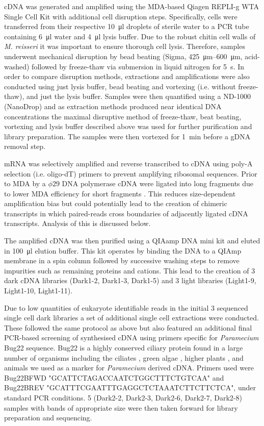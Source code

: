 cDNA was generated and amplified using the MDA-based Qiagen REPLI-g WTA Single Cell Kit \citep{Korfhage2015}
with additional cell disruption steps. 
Specifically, cells were transferred from their respective \SI{10}{\micro\litre} droplets of sterile water to
a PCR tube containing \SI{6}{\micro\litre} water and \SI{4}{\micro\litre} lysis buffer. 
Due to the robust chitin cell walls of \textit{M. reisseri} \citep{Kapaun1995} it was important to
ensure thorough cell lysis. Therefore, samples underwent mechanical disruption by bead beating (Sigma, \SIrange{425}{600}{\micro\metre}, 
acid-washed) followed by freeze-thaw via submersion in liquid nitrogen for \SI{5}{\second}.
In order to compare disruption methods, extractions and amplifications
were also conducted using just lysis buffer, bead beating and vortexing (i.e. without freeze-thaw), 
and just the lysis buffer.  Samples were then quantified using a ND-1000 (NanoDrop)
and as extraction methods produced near identical DNA concentrations 
the maximal disruptive method of freeze-thaw, beat beating, vortexing and lysis buffer
described above was used for further purification and library preparation.
The samples were then vortexed for \SI{1}{\minute} before a gDNA removal step.

mRNA was selectively amplified and reverse transcribed to cDNA using poly-A selection (i.e. oligo-dT) primers
to prevent amplifying ribosomal sequences. Prior to MDA by a \(\phi29\) DNA polymerase
cDNA were ligated into long fragments due to lower MDA efficiency for short fragments \citep{Korfhage2015}.
This reduces size-dependent amplification bias but could potentially lead to the creation
of chimeric transcripts in which paired-reads cross boundaries of adjacently ligated
cDNA transcripts.  Analysis of this is discussed below.

The amplified cDNA was then purified using a QIAamp DNA mini kit and eluted in \SI{100}{\micro\litre} elution buffer.
This kit operates by binding the DNA to a QIAmp membrane in a spin column followed by successive washing steps
to remove impurities such as remaining proteins and cations. This lead to the creation of 3 dark cDNA 
libraries (Dark1-2, Dark1-3, Dark1-5) and 3 light libraries (Light1-9, Light1-10, Light1-11).


Due to low quantities of eukaryote identifiable reads in the initial 3 sequenced single cell
dark libraries a set of additional single cell extractions were conducted. 
These followed the same protocol as above but also featured an additional
final PCR-based screening of synthesised cDNA using primers specific for \textit{Paramecium}
Bug22 sequence. Bug22 is a highly conserved ciliary protein found in a large number of organisms
including the ciliates \citep{Smith2005,Laligne2010}, green algae \citep{Keller2005,Laligne2010,Meng2014}, higher plants \citep{Hodges2011}, and animals \citep{MendesMaia2014} we used as a marker for \textit{Paramecium} derived cDNA.
Primers used were Bug22BFWD "GCATTCTAGACCAATCTGGCTTTCTGTCAA" and Bug22BREV "GCATTTCGAATTTGAGGCTCTAAATCTTCTTCTCA",
under standard PCR conditions.  5 (Dark2-2, Dark2-3, Dark2-6, Dark2-7, Dark2-8) samples with 
bands of appropriate size were then taken forward for library preparation and sequencing.



